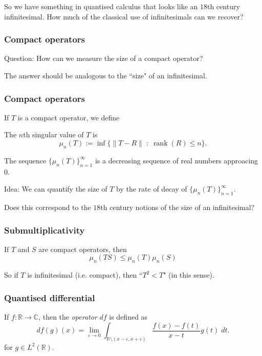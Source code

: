 \documentclass{beamer}
\newcommand{\Rl}{\mathbb{R}}
\newcommand{\Cplx}{\mathbb{C}}
\begin{document}
\begin{frame}
    So we have something in quantised calculus that looks
    like an $18$th century
    infinitesimal. How much of the classical use of infinitesimals
    can we recover?
\end{frame}

\begin{frame}
\frametitle{Compact operators}
\begin{block}
    {Question:}
    How can we measure the size of a compact operator?
\end{block}
The answer should be analogous to the ``size" of an infinitesimal.
\end{frame}

\begin{frame}
\frametitle{Compact operators}
If $T$ is a compact operator, we define
\begin{definition}
The $n$th singular value of $T$ is
\begin{equation*}
    \mu_n(T) := \inf\{\|T-R\|\;:\;\operatorname{rank}(R) \leq n\}.
\end{equation*}
\end{definition}
The sequence $\{\mu_n(T)\}_{n=1}^\infty$ is a decreasing sequence of 
real numbers approacing $0$.
\end{frame}

\begin{frame}
\begin{block}
{Idea:}
We can quantify the size of $T$ by the rate of decay of $\{\mu_n(T)\}_{n=1}^\infty$.
\end{block}
Does this correspond to the $18$th century notions of the size of an infinitesimal?
\end{frame}

\begin{frame}
\frametitle{Submultiplicativity}
\begin{theorem}
    If $T$ and $S$ are compact operators, then
    \begin{equation*}
        \mu_n(TS) \leq \mu_n(T)\mu_n(S)
    \end{equation*}
\end{theorem}
So if $T$ is infinitesimal (i.e. compact), then ``$T^2 < T$" (in this sense).
\end{frame}

\begin{frame}
\frametitle{Quantised differential}
\begin{definition}
    If $f:\Rl\rightarrow\Cplx$, then the \emph{operator}
    $df$ is defined as
    \begin{equation*}
        df(g)(x) = \lim_{\varepsilon\rightarrow 0}\int_{\Rl\setminus (x-\varepsilon,x+\varepsilon)} \frac{f(x)-f(t)}{x-t}g(t)\;dt.
    \end{equation*}
    for $g \in L^2(\Rl)$.
\end{definition}
\end{frame}
\end{document}
